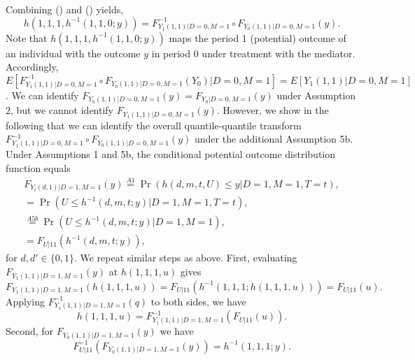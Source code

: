 \documentclass[a4paper,12pt]{article}
\begin{document}
 \doublespacing \pagestyle{plain}
Combining () and () yields,
\begin{equation} 
h(1,1,1,h^{-1}(1,1,0;y))  =F_{Y_1(1,1)|D=0,M=1}^{-1} \circ F_{Y_0(1,1)|D=0,M=1}(y) .
\end{equation}
Note that $h(1,1,1,h^{-1}(1,1,0;y))$ maps the period 1 (potential) outcome of an individual with the outcome $y$ in period 0 under treatment with the mediator. Accordingly, $E[F_{Y_1(1,1)|D=0,M=1}^{-1} \circ F_{Y_0(1,1)|D=0,M=1}(Y_0)|D=0,M=1]= E[Y_1(1,1)|D=0,M=1]$. We can identify $F_{Y_0(1,1)|D=0,M=1}(y)= F_{Y_0|D=0,M=1}(y)$ under Assumption 2, but we cannot identify $F_{Y_1(1,1)|D=0,M=1}(y)$. However, we show in the following that we can identify the overall quantile-quantile transform $F_{Y_1(1,1)|D=0,M=1}^{-1} \circ F_{Y_0(1,1)|D=0,M=1}(y)$ under the additional Assumption 5b.
Under Assumptions 1 and 5b, the conditional potential outcome distribution function equals
\begin{equation} 
\begin{array}{rl}
 F_{Y_t(d,1)|D=1,M=1}(y)  \stackrel{A1}{=} \Pr(h(d,m,t,U) \leq y|D=1,M=1,T=t) ,\\
= \Pr(U \leq h^{-1}(d,m,t;y)|D=1,M=1,T=t) ,\\
\stackrel{A5b}{=} \Pr(U \leq h^{-1}(d,m,t;y)|D=1,M=1) ,\\
= F_{U|11} ( h^{-1}(d,m,t;y)),
\end{array}
\end{equation}
for $d,d' \in \{0,1\}$. We repeat similar steps as above. First, evaluating $F_{Y_1(1,1)|D=1,M=1}(y)$ at $h(1,1,1,u)$ gives
\begin{equation*}
F_{Y_1(1,1)|D=1,M=1}(h(1,1,1,u)) = F_{U|11} ( h^{-1}(1,1,1;h(1,1,1,u)))  =F_{U|11} ( u).
\end{equation*}
Applying $F_{Y_1(1,1)|D=1,M=1}^{-1}(q)$ to both sides, we have
\begin{equation} 
h(1,1,1,u)  =F_{Y_1(1,1)|D=1,M=1}^{-1}(F_{U|11} ( u)).
\end{equation}
Second, for $F_{Y_0(1,1)|D=1,M=1}(y)$ we have
\begin{equation} 
F_{U|11}^{-1} ( F_{Y_0(1,1)|D=1,M=1}(y)) =   h^{-1}(1,1,1;y).
\end{equation}
\end{document}
